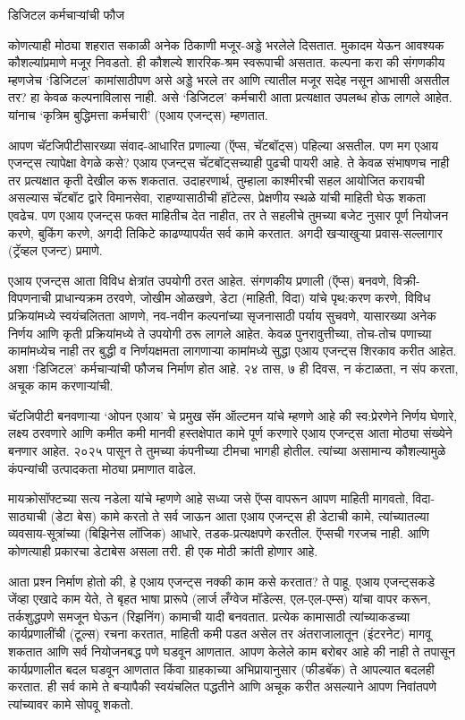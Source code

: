डिजिटल कर्मचाऱ्यांची फौज

कोणत्याही मोठ्या शहरात सकाळी अनेक ठिकाणी मजूर-अड्डे भरलेले दिसतात. मुकादम येऊन आवश्यक कौशल्यांप्रमाणे मजूर निवडतो. ही कौशल्ये शाररिक-श्रम स्वरूपाची असतात. कल्पना करा की संगणकीय म्हणजेच ‘डिजिटल’ कामांसाठीपण असे अड्डे भरले तर आणि त्यातील मजूर सदेह  नसून आभासी असतील तर? हा केवळ कल्पनाविलास  नाही. असे ‘डिजिटल’ कर्मचारी आता प्रत्यक्षात उपलब्ध होऊ लागले आहेत. यांनाच ‘कृत्रिम बुद्धिमत्ता कर्मचारी’ (एआय एजन्ट्स) म्हणतात. 

आपण चॅटजिपीटीसारख्या संवाद-आधारित प्रणाल्या (ऍप्स, चॅटबॉट्स) पहिल्या असतील. पण मग एआय एजन्ट्स त्यापेक्षा वेगळे कसे? एआय एजन्ट्स चॅटबॉट्सच्याही पुढची पायरी आहे. ते केवळ संभाषणच नाही तर प्रत्यक्षात कृती देखील करू शकतात. उदाहरणार्थ, तुम्हाला काश्मीरची सहल आयोजित करायची असल्यास चॅटबॉट द्वारे विमानसेवा, राहण्यासाठीची हॉटेल्स, प्रेक्षणीय स्थळे यांची माहिती घेऊ शकता एवढेच. पण एआय एजन्ट्स फक्त माहितीच देत नाहीत, तर ते सहलीचे तुमच्या बजेट नुसार पूर्ण नियोजन करणे, बुकिंग करणे, अगदी तिकिटे काढण्यापर्यंत सर्व कामे करतात. अगदी खऱ्याखुऱ्या प्रवास-सल्लागार (ट्रॅव्हल एजन्ट) प्रमाणे. 

एआय एजन्ट्स  आता विविध क्षेत्रांत उपयोगी ठरत आहेत. संगणकीय प्रणाली (ऍप्स) बनवणे, विक्री-विपणनाची प्राधान्यक्रम ठरवणे, जोखीम ओळखणे, डेटा (माहिती, विदा) यांचे पृथ:करण करणे, विविध प्रक्रियांमध्ये स्वयंचलितता आणणे, नव-नवीन कल्पनांच्या सृजनासाठी पर्याय सुचवणे, यासारख्या अनेक निर्णय आणि कृती प्रक्रियांमध्ये ते उपयोगी ठरू लागले आहेत. केवळ पुनरावुत्तीच्या, तोच-तोच पणाच्या कामांमध्येच नाही तर बुद्धी व निर्णयक्षमता लागणाऱ्या कामांमध्ये सुद्धा एआय एजन्ट्स शिरकाव करीत आहेत. अशा ‘डिजिटल’ कर्मचाऱ्यांची फौजच निर्माण होत आहे. २४ तास, ७ ही दिवस, न कंटाळता, न संप करता, अचूक काम करणाऱ्यांची. 

चॅटजिपीटी बनवणाऱ्या ‘ओपन एआय’ चे प्रमुख सॅम ऑल्टमन यांचे म्हणणे आहे की स्व:प्रेरणेने निर्णय घेणारे, लक्ष्य ठरवणारे आणि कमीत कमी मानवी हस्तक्षेपात कामे पूर्ण करणारे एआय एजन्ट्स आता मोठ्या संख्येने बनणार आहेत. २०२५ पासून ते तुमच्या कंपनीच्या टीमचा भागही होतील. त्यांच्या असामान्य कौशल्यामुळे कंपन्यांची उत्पादकता मोठ्या प्रमाणात वाढेल. 

मायक्रोसॉफ्टच्या सत्य नडेला यांचे म्हणणे आहे सध्या जसे ऍप्स वापरून आपण माहिती मागवतो, विदा-साठ्याची  (डेटा बेस) कामे करतो ते सर्व जाऊन आता एआय एजन्ट्स  ही डेटाची कामे, त्यांच्यातल्या व्यवसाय-सूत्रांच्या (बिझिनेस लॉजिक) आधारे, तडक-प्रत्यक्षपणे करतील. ऍप्सची गरजच नाही. आणि कोणत्याही प्रकारचा डेटाबेस असला तरी. ही एक मोठी क्रांती होणार आहे.

आता प्रश्न निर्माण होतो की, हे एआय एजन्ट्स नक्की काम कसे करतात? ते पाहू. एआय एजन्ट्सकडे जेंव्हा एखादे काम येते, ते बृहत भाषा प्रारूपे (लार्ज लँग्वेज मॉडेल्स, एल-एल-एम्स) यांचा वापर करून, तर्कशुद्धपणे समजून घेऊन (रिझनिंग) कामाची यादी बनवतात. प्रत्येक कामासाठी त्यांच्याकडच्या कार्यप्रणालींची (टूल्स) रचना करतात, माहिती कमी पडत असेल तर अंतराजालातून (इंटरनेट) मागवू शकतात आणि सर्व नियोजनबद्ध पणे घडवून आणतात. आपण केलेले काम बरोबर आहे की नाही ते तपासून कार्यप्रणालीत बदल घडवून आणतात किंवा ग्राहकाच्या अभिप्रायानुसार (फीडबॅक) ते आपल्यात बदलही करतात. ही सर्व कामे ते बऱ्यापैकी स्वयंचलित पद्धतीने आणि अचूक करीत असल्याने आपण निवांतपणे त्यांच्यावर कामे सोपवू शकतो. 

